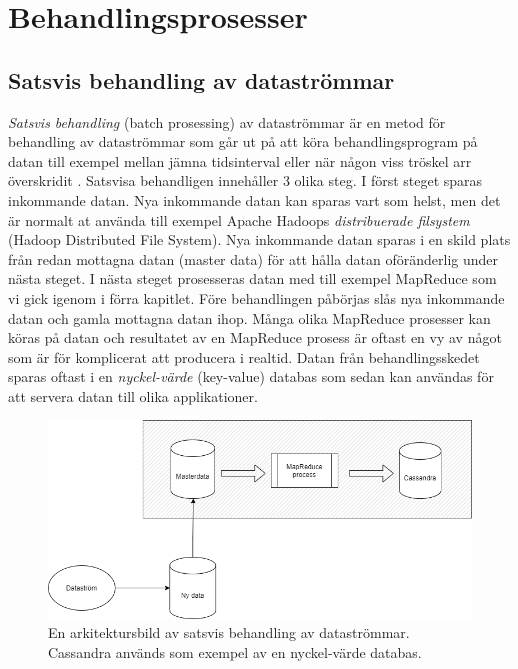 \chapter{Behandlingsprosesser}

\section{Satsvis behandling av dataströmmar}

\textit{Satsvis behandling} (batch prosessing) av dataströmmar är en metod för behandling av 
dataströmmar som går ut på att köra behandlingsprogram på datan till exempel mellan jämna
tidsinterval eller när någon viss tröskel arr överskridit \citep{marz2013big}. Satsvisa behandligen
innehåller 3 olika steg. I först steget sparas inkommande datan. Nya inkommande datan kan sparas vart
som helst, men det är normalt at använda till exempel Apache Hadoops \textit{distribuerade 
filsystem} (Hadoop Distributed File System). Nya inkommande datan sparas i en skild plats från redan
mottagna datan (master data) för att hålla datan oföränderlig under nästa steget. I nästa steget prosesseras datan med till exempel
MapReduce som vi gick igenom i förra kapitlet. Före behandlingen påbörjas slås nya inkommande datan och gamla mottagna datan ihop.
Många olika MapReduce prosesser kan köras på datan och resultatet av en MapReduce prosess är oftast en vy av något som är
för komplicerat att producera i realtid. Datan från behandlingsskedet sparas oftast i en \textit{nyckel-värde} (key-value) databas som sedan kan användas
för att servera datan till olika applikationer.

\begin{figure}[h]
    \centering
    \includegraphics[scale=0.6]{img/batch-pipeline.png}
    \caption{En arkitektursbild av satsvis behandling av dataströmmar. Cassandra används som exempel av en nyckel-värde databas.}
    \label{fig:mesh1}
\end{figure}


